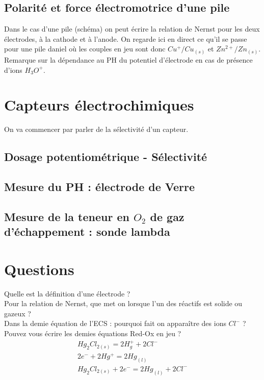 \documentclass[12pt,prb,aps,epsf]{article}
\begin{document}
 \subsection{Polarité et force électromotrice d'une pile}
 
Dans le cas d'une pile (schéma) on peut écrire la relation de Nernst pour les deux électrodes, à la cathode et à l'anode. On regarde ici en direct ce qu'il se passe pour une pile daniel où les couples en jeu sont donc $Cu^+/Cu_{(s)}$ et $Zn^{2+}/Zn_{(s)}$.\\
Remarque sur la dépendance au PH du potentiel d'électrode en cas de présence d'ions $H_3O^+$.

\section{Capteurs électrochimiques}
On va commencer par parler de la sélectivité d'un capteur.
\subsection{Dosage potentiométrique - Sélectivité}
\subsection{Mesure du PH : électrode de Verre}
\subsection{Mesure de la teneur en $O_2$ de gaz d'échappement : sonde lambda}


\section*{Questions}
Quelle est la définition d'une électrode ?\\

Pour la relation de Nernst, que met on lorsque l'un des réactifs est solide ou gazeux ?\\

Dans la demie équation de l'ECS : pourquoi fait on apparaître des ions $Cl^-$ ?\\
Pouvez vous écrire les demies équations Red-Ox en jeu ?\\
\begin{eqnarray}
Hg_2Cl_{2(s)} = 2H_g^+ + 2Cl^-\\2e^- + 2Hg^+ = 2Hg_{(l)}\\
Hg_2Cl_{2(s)} + 2e^- = 2Hg_{(l)} + 2Cl^-
\end{eqnarray}
\end{document}
